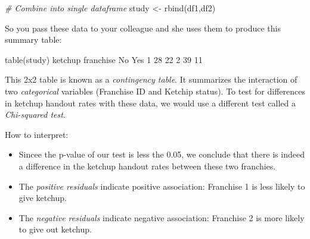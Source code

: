 \documentclass[
]{book}
\newenvironment{Shaded}{\begin{snugshade}}{\end{snugshade}}
\newcommand{\CommentTok}[1]{\textcolor[rgb]{0.56,0.35,0.01}{\textit{#1}}}
\newcommand{\DecValTok}[1]{\textcolor[rgb]{0.00,0.00,0.81}{#1}}
\newcommand{\FloatTok}[1]{\textcolor[rgb]{0.00,0.00,0.81}{#1}}
\newcommand{\FunctionTok}[1]{\textcolor[rgb]{0.00,0.00,0.00}{#1}}
\newcommand{\NormalTok}[1]{#1}
\newcommand{\OtherTok}[1]{\textcolor[rgb]{0.56,0.35,0.01}{#1}}
\newcommand{\SpecialCharTok}[1]{\textcolor[rgb]{0.00,0.00,0.00}{#1}}
\begin{document}
\begin{Shaded}
\begin{Highlighting}[]
\CommentTok{\# Combine into single dataframe}
\NormalTok{study }\OtherTok{\textless{}{-}} \FunctionTok{rbind}\NormalTok{(df1,df2)}
\end{Highlighting}
\end{Shaded}

So you pass these data to your colleague and she uses them to produce this summary table:

\begin{Shaded}
\begin{Highlighting}[]
\FunctionTok{table}\NormalTok{(study)}
\NormalTok{         ketchup}
\NormalTok{franchise No Yes}
        \DecValTok{1} \DecValTok{28}  \DecValTok{22}
        \DecValTok{2} \DecValTok{39}  \DecValTok{11}
\end{Highlighting}
\end{Shaded}

This 2x2 table is known as a \emph{contingency table}. It summarizes the interaction of two \emph{categorical} variables (Franchise ID and Ketchip status). To test for differences in ketchup handout rates with these data, we would use a different test called a \emph{Chi-squared test}.

\begin{Shaded}
\end{Shaded}

How to interpret:

\begin{itemize}
\item
  Sincee the p-value of our test is less the 0.05, we conclude that there is indeed a difference in the ketchup handout rates between these two franchies.
\item
  The \emph{positive residuals} indicate positive association: Franchise 1 is less likely to give ketchup.
\item
  The \emph{negative residuals} indicate negative association: Franchise 2 is more likely to give out ketchup.
\end{itemize}
\end{document}
